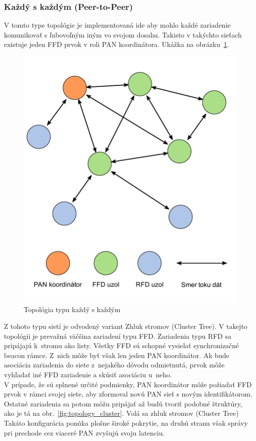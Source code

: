 \subsubsection{Každý s každým (Peer-to-Peer)}
\indent\indent V tomto type topológie je implementovaná ide aby mohlo každé zariadenie komunikovať s ľubovoľným iným vo svojom dosahu. Takisto v takýchto sieťach existuje jeden FFD prvok v roli PAN koordinátora. Ukážka na obrázku~\ref{fig:topology_p2p}.\\
\begin{figure}[htbp]
\begin{center}
\includegraphics[width=120mm]{figures/topology_p2p}
\caption{Topológia typu každý s každým}
\label{fig:topology_p2p}
\end{center}
\end{figure} 
\indent Z tohoto typu sietí je odvodený variant Zhluk stromov (Cluster Tree). V takejto topológii je prevažná väčšina zariadení typu FFD. Zariadenia typu RFD sa pripájajú k~stromu ako listy. Všetky FFD sú schopné vysielať synchronizačné beacon rámce. Z~nich môže byť však len jeden PAN koordinátor. Ak bude asociácia zariadenia do siete z~nejakého dôvodu odmietnutá, prvok môže vyhľadať iné FFD zariadenie a skúsiť asociáciu u~neho.\\
\indent V prípade, že sú splnené určité podmienky, PAN koordinátor môže požiadať FFD prvok v rámci svojej siete, aby  zformoval novú PAN sieť s novým identifikátorom. Ostatné zariadenia sa potom môžu pripájať až budú tvoriť podobné štruktúry, ako je tá na obr.~\ref{fig:topology_cluster}. Volá sa zhluk stromov (Cluster Tree) Takáto konfigurácia ponúka plošne široké pokrytie, na druhú stranu však správy pri prechode cez viaceré PAN zvyšujú svoju latenciu.\\
